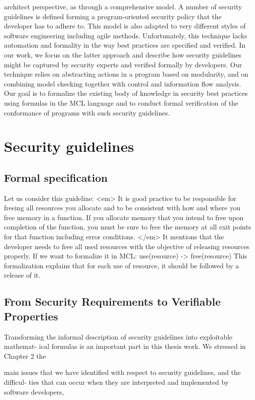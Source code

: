 \documentclass[10pt]{article}
\begin{document}
architect perspective, as through a comprehensive model. A number of security guidelines is
defined forming a program-oriented security policy that the developer has to adhere to. This
model is also adapted to very different styles of software engineering including agile methods.
Unfortunately, this technique lacks automation and formality in the way best practices are
specified and verified.
In our work, we focus on the latter approach and describe how security guidelines might
be captured by security experts and verified formally by developers. Our technique relies
on abstracting actions in a program based on modularity, and on combining model checking
together with control and information flow analysis. Our goal is to formalize the existing
body of knowledge in security best practices using formulas in the MCL language and to
conduct formal verification of the conformance of programs with such security guidelines.
\section{Security guidelines}
\subsection {Formal specification}
Let us consider this guideline:
<em> It is good practice to be responsible for freeing all resources you allocate and to be consistent with how and where you free memory in a function. If you allocate memory that you intend to free upon completion of the function, you must be sure to free the memory at all exit points for that function including error conditions.
 </em> \cite{https://cwe.mitre.org/data/definitions/404.html}
It mentions that the developer needs to free all used resources with the objective of releasing resources properly.
If we want to formalize it in MCL:
use(resource) -> free(resource)
This formalization explains that for each use of resource, it should be followed by a release of it.

\subsection {From Security Requirements to Verifiable Properties}
Transforming the informal description of security guidelines into exploitable mathemat-
ical formulas is an important part in this thesis work. We stressed in Chapter 2 the

main issues that we have identified with respect to security guidelines, and the difficul-
ties that can occur when they are interpreted and implemented by software developers,
\end{document}
